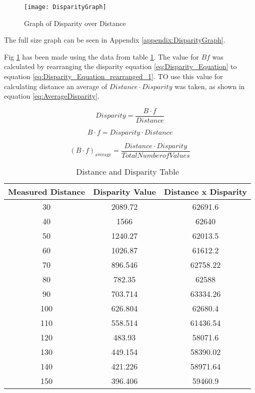 \documentclass[conference]{IEEEtran}
\begin{document}
\begin{figure}[H]
\centerline{\texttt{[image: DisparityGraph]}}
\caption{Graph of Disparity over Distance }
\label{fig:DisparityGraph}
\end{figure} 

The full size graph can be seen in Appendix \ref{appendix:DisparityGraph}.

Fig \ref{fig:DisparityGraph} has been made using the data from table \ref{table:distance_and_disparity_tables}. The value for $Bf$ was calculated by rearranging the disparity equation \ref{eq:Disparity_Equation} to equation \ref{eq:Disparity_Equation_rearranged_1}. TO use this value for calculating distance an average of $Distance \cdot Disparity$ was taken, as shown in equation \ref{eq:AverageDisparity}. 

\begin{equation} \label{eq:Disparity_Equation}
Disparity = \frac{B \cdot f}{Distance}
\end{equation}

\begin{equation} \label{eq:Disparity_Equation_rearranged_1}
B \cdot f = Disparity \cdot Distance
\end{equation}

\begin{equation} \label{eq:AverageDisparity}
(B \cdot f)_\textrm{average} = \frac{Distance \cdot Disparity}{Total Number of Values}
\end{equation}

\begin{table}
\begin{center}
\caption{Distance and Disparity Table}
\begin{tabular}{ || c || c || c || }
\hline
 Measured Distance & Disparity Value & Distance x Disparity\\ 
\hline
 30 & 2089.72 & 62691.6 \\  
\hline
 40 & 1566 & 62640 \\  
\hline
 50 & 1240.27 & 62013.5 \\  
\hline
 60 & 1026.87 & 61612.2 \\  
\hline
 70 & 896.546 & 62758.22 \\  
\hline
 80 & 782.35 & 62588 \\  
\hline
 90 & 703.714 & 63334.26 \\  
\hline
 100 & 626.804 & 62680.4 \\  
\hline
 110 & 558.514 & 61436.54 \\  
\hline
 120 & 483.93 & 58071.6 \\  
\hline
 130 & 449.154 & 58390.02 \\  
\hline
 140 & 421.226 & 58971.64 \\  
\hline
 150 & 396.406 & 59460.9 \\  
\hline

\end{tabular}
\label{table:distance_and_disparity_tables}
\end{center}
\end{table}
\end{document}
